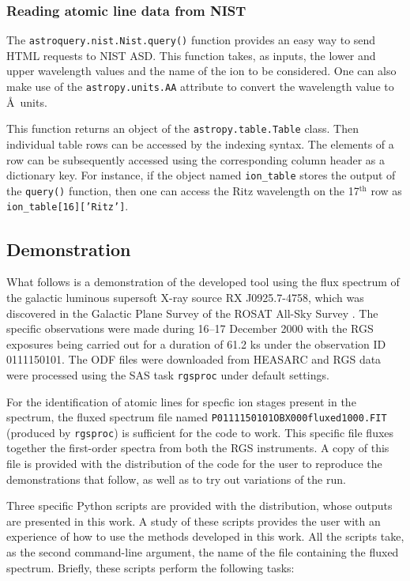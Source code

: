             \subsubsection{Reading atomic line data from NIST} \label{tool:rgs-files:line-collection:NIST}
                The \texttt{astroquery.nist.Nist.query()} function provides an easy way to send HTML requests to NIST ASD. This function takes, as inputs, the lower and upper wavelength values and the name of the ion to be considered. One can also make use of the \texttt{astropy.units.AA} attribute to convert the wavelength value to \AA\ units.
                
                This function returns an object of the \texttt{astropy.table.Table} class. Then individual table rows can be accessed by the indexing syntax. The elements of a row can be subsequently accessed using the corresponding column header as a dictionary key. For instance, if the object named \texttt{ion\_table} stores the output of the \texttt{query()} function, then one can access the Ritz wavelength on the 17$^\text{th}$ row as \texttt{ion\_table[16]['Ritz']}.
        
        \subsection{Demonstration} \label{tool:rgs-files:demonstration}
            What follows is a demonstration of the developed tool using the flux spectrum of the galactic luminous supersoft X-ray source RX J0925.7-4758, which was discovered in the Galactic Plane Survey of the ROSAT All-Sky Survey \cite{motch1994}. The specific observations were made during 16--17 December 2000 with the RGS exposures being carried out for a duration of 61.2 ks \cite{motch02} under the observation ID 0111150101. The ODF files were downloaded from HEASARC and RGS data were processed using the SAS task \texttt{rgsproc} under default settings.
            
            For the identification of atomic lines for specfic ion stages present in the spectrum, the fluxed spectrum file named \texttt{P0111150101OBX000fluxed1000.FIT} (produced by \texttt{rgsproc}) is sufficient for the code to work. This specific file fluxes together the first-order spectra from both the RGS instruments. A copy of this file is provided with the distribution of the code for the user to reproduce the demonstrations that follow, as well as to try out variations of the run.
            
            Three specific Python scripts are provided with the distribution, whose outputs are presented in this work. A study of these scripts provides the user with an experience of how to use the methods developed in this work. All the scripts take, as the second command-line argument, the name of the file containing the fluxed spectrum. Briefly, these scripts perform the following tasks:
            
